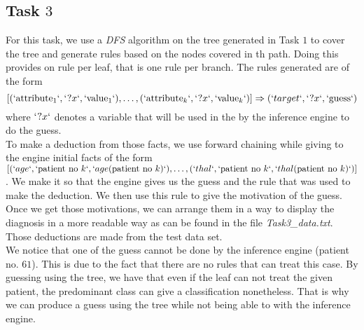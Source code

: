 \documentclass[french]{article}
\begin{document}
\subsection{Task $3$}
	For this task, we use a \emph{DFS} algorithm on the tree generated in Task $1$ to cover the tree and generate rules based on the nodes covered in th path. Doing this provides on rule per leaf, that is one rule per branch. The rules generated are of the form $$ [(`\mathrm{attribute}_1`,` ?x`, `\mathrm{value}_1`),\ldots,(`\mathrm{attribute}_k`,` ?x`, `\mathrm{value}_k`)]\Rightarrow(`target`, `?x` , `\mathrm{guess}`)$$ where $`?x`$ denotes a variable that will be used in the by the inference engine to do the guess.\\
	To make a deduction from those facts, we use forward chaining while giving to the engine initial facts of the form $[(`age`, `\mathrm{patient\ no}\ k`, `age(\mathrm{patient\ no}\ k)`),\ldots,(`thal`, `\mathrm{patient\ no}\ k`, `thal(\mathrm{patient\ no}\ k)`)]$. We make it so that the engine gives us the guess and the rule that was used to make the deduction. We then use this rule to give the motivation of the guess. Once we get those motivations, we can arrange them in a way to display the diagnosis in a more readable way as can be found in the file \emph{Task3\_data.txt}. Those deductions are made from the test data set.\\
	We notice that one of the guess cannot be done by the inference engine (patient no. $61$). This is due to the fact that there are no rules that can treat this case. By guessing using the tree, we have that even if the leaf can not treat the given patient, the predominant class can give a classification nonetheless. That is why we can produce a guess using the tree while not being able to with the inference engine.
	
\end{document}

